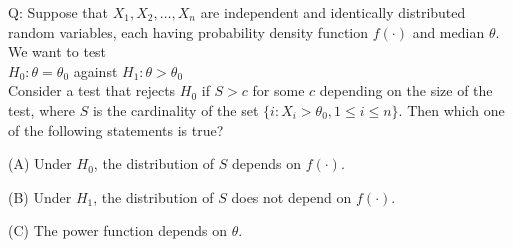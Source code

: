 \documentclass[journal,12pt,onecolumn]{IEEEtran}
\theoremstyle{remark}
\begin{document}
\let\vec\mathbf




\vspace{3cm}



\bigskip

\renewcommand{\thefigure}{\theenumi}
\renewcommand{\thetable}{\theenumi}
Q: Suppose that $X_1, X_2, \ldots, X_n$ are independent and identically distributed random variables, each having probability density function $f(\cdot)$ and median $\theta$. We want to test\\
$H_0: \theta = \theta_0$ against $H_1: \theta > \theta_0$\\
Consider a test that rejects $H_0$ if $S > c$ for some $c$ depending on the size of the test, where $S$ is the cardinality of the set $\{i : X_i > \theta_0, 1 \leq i \leq n\}$. Then which one of the following statements is true?

(A) Under $H_0$, the distribution of $S$ depends on $f(\cdot)$.

(B) Under $H_1$, the distribution of $S$ does not depend on $f(\cdot)$.

(C) The power function depends on $\theta$.
\end{document}
